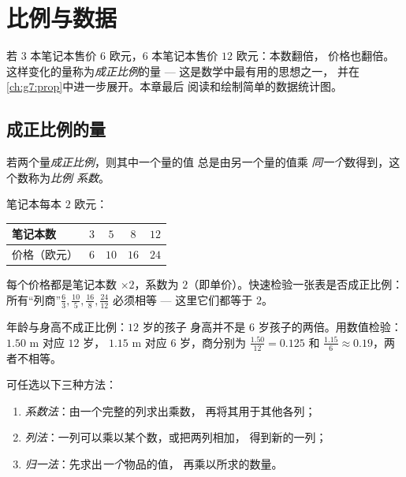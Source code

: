 \chapter{比例与数据}\label{ch:g6:propdata}

若 3 本笔记本售价 $6$ 欧元，6 本笔记本售价 $12$ 欧元：本数翻倍，
价格也翻倍。
这样变化的量称为\emph{成正比例}的量 --- 这是数学中最有用的思想之一，
并在\cref{ch:g7:prop}中进一步展开。本章最后
阅读和绘制简单的数据统计图。

\section{成正比例的量}

\begin{definition}[成正比例]\label{def:g6:propdata:def}
若两个量\emph{成正比例}，则其中一个量的值
总是由另一个量的值乘
\emph{同一个}数得到，这个数称为\emph{比例
系数}。
\end{definition}

\begin{example}\label{ex:g6:propdata:table}
笔记本每本 $2$ 欧元：
\begin{center}
\renewcommand{\arraystretch}{1.3}
\begin{tabular}{l|cccc}
笔记本数 & $3$ & $5$ & $8$ & $12$ \\
\hline
价格（欧元） & $6$ & $10$ & $16$ & $24$ \\
\end{tabular}
\end{center}
每个价格都是笔记本数 $\times 2$，系数为
$2$（即单价）。快速检验一张表是否成正比例：
所有“列商”$\frac{6}{3}, \frac{10}{5}, \frac{16}{8},
\frac{24}{12}$ 必须相等 --- 这里它们都等于 $2$。
\end{example}

\begin{example}[反例]\label{ex:g6:propdata:nonexample}
年龄与身高不成正比例：$12$ 岁的孩子
身高并不是 $6$ 岁孩子的两倍。用数值检验：$1.50$ m 对应 $12$ 岁，
$1.15$ m 对应 $6$ 岁，商分别为 $\frac{1.50}{12} = 0.125$ 和
$\frac{1.15}{6} \approx 0.19$，两者不相等。
\end{example}

\begin{method}[补全比例表]\label{met:g6:propdata:complete}
可任选以下三种方法：
\begin{enumerate}
  \item \emph{系数法}：由一个完整的列求出乘数，
        再将其用于其他各列；
  \item \emph{列法}：一列可以乘以某个数，或把两列相加，
        得到新的一列；
  \item \emph{归一法}：先求出\emph{一个}物品的值，
        再乘以所求的数量。
\end{enumerate}
\end{method}

